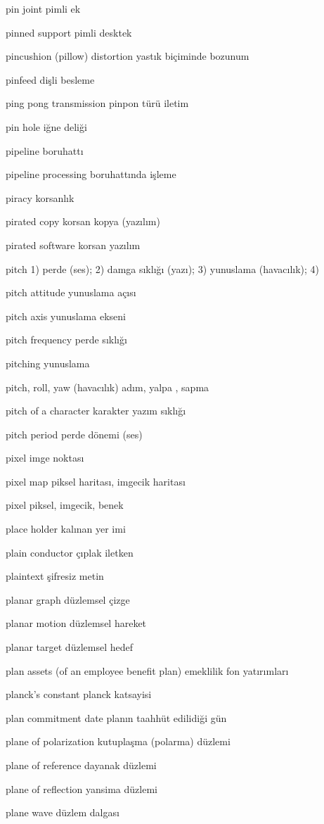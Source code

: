 \documentclass[12pt,fleqn]{article}\usepackage{../../common}
\begin{document}
pin joint pimli ek

pinned support pimli desktek


pincushion (pillow) distortion yastık biçiminde bozunum

pinfeed dişli besleme

ping pong transmission pinpon türü iletim

pin hole iğne deliği

pipeline boruhattı

pipeline processing boruhattında işleme

piracy korsanlık

pirated copy korsan kopya (yazılım)

pirated software korsan yazılım

pitch 1) perde (ses); 2) damga sıklığı (yazı); 3) yunuslama (havacılık); 4)

pitch attitude yunuslama açısı

pitch axis yunuslama ekseni

pitch frequency perde sıklığı

pitching yunuslama

pitch, roll, yaw (havacılık) adım, yalpa , sapma

pitch of a character karakter yazım sıklığı

pitch period perde dönemi (ses)

pixel imge noktası

pixel map piksel haritası, imgecik haritası

pixel piksel, imgecik, benek

place holder kalınan yer imi

plain conductor çıplak iletken

plaintext şifresiz metin

planar graph düzlemsel çizge

planar motion düzlemsel hareket

planar target düzlemsel hedef

plan assets (of an employee benefit plan) emeklilik fon yatırımları

planck's constant planck katsayisi

plan commitment date planın taahhüt edilidiği gün

plane of polarization kutuplaşma (polarma) düzlemi

plane of reference dayanak düzlemi

plane of reflection yansima düzlemi

plane wave düzlem dalgası
\end{document}
